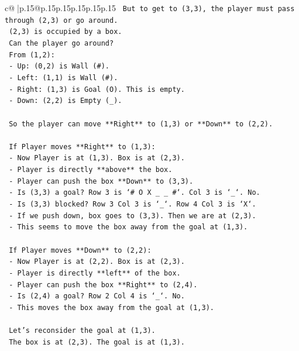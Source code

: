 \documentclass{article}
\begin{document}
{\begin{supertabular}{c@{$\;$}|p{.15\linewidth}@{}p{.15\linewidth}p{.15\linewidth}p{.15\linewidth}p{.15\linewidth}p{.15\linewidth}}
{{{\texttt{   But to get to (3,3), the player must pass through (2,3) or go around.} \\
\texttt{   (2,3) is occupied by a box.} \\
\texttt{   Can the player go around?} \\
\texttt{   From (1,2):} \\
\texttt{   {-} Up: (0,2) is Wall (\#).} \\
\texttt{   {-} Left: (1,1) is Wall (\#).} \\
\texttt{   {-} Right: (1,3) is Goal (O). This is empty.} \\
\texttt{   {-} Down: (2,2) is Empty (\_).} \\
\\ 
\texttt{   So the player can move **Right** to (1,3) or **Down** to (2,2).} \\
\\ 
\texttt{   If Player moves **Right** to (1,3):} \\
\texttt{   {-} Now Player is at (1,3). Box is at (2,3).} \\
\texttt{   {-} Player is directly **above** the box.} \\
\texttt{   {-} Player can push the box **Down** to (3,3).} \\
\texttt{   {-} Is (3,3) a goal? Row 3 is `\# O X \_ \_ \#`. Col 3 is `\_`. No.} \\
\texttt{   {-} Is (3,3) blocked? Row 3 Col 3 is `\_`. Row 4 Col 3 is `X`.} \\
\texttt{   {-} If we push down, box goes to (3,3). Then we are at (2,3).} \\
\texttt{   {-} This seems to move the box away from the goal at (1,3).} \\
\\ 
\texttt{   If Player moves **Down** to (2,2):} \\
\texttt{   {-} Now Player is at (2,2). Box is at (2,3).} \\
\texttt{   {-} Player is directly **left** of the box.} \\
\texttt{   {-} Player can push the box **Right** to (2,4).} \\
\texttt{   {-} Is (2,4) a goal? Row 2 Col 4 is `\_`. No.} \\
\texttt{   {-} This moves the box away from the goal at (1,3).} \\
\\ 
\texttt{   Let's reconsider the goal at (1,3).} \\
\texttt{   The box is at (2,3). The goal is at (1,3).} \\
}}}
\end{supertabular}}
\end{document}
